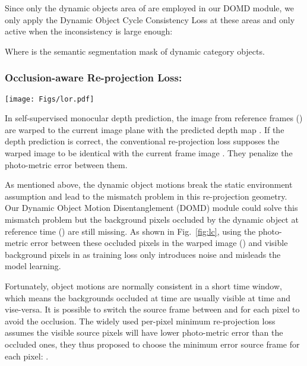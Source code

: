 \documentclass[runningheads]{llncs}
\begin{document}
Since only the dynamic objects area of  are employed in our DOMD module, we only apply the Dynamic Object Cycle Consistency Loss  at these areas and only active when the inconsistency is large enough:

Where  is the semantic segmentation mask of dynamic category objects. 

\subsubsection{Occlusion-aware Re-projection Loss: }

\begin{figure*}[t]
\centering
\texttt{[image: Figs/lor.pdf]}
\caption{ \textbf{Occlusion-aware Re-projection Loss: }Using the non-occluded source pixels for the re-projection loss could avoid most occlusions. The widely-used~\cite{monodepth2,manydepth,featdepth} per-pixel minimum  fails when the occluded pixels do not have lower photo-metric error. We propose Occlusion-aware Re-projection Loss  to solve this problem.}
\label{fig:lc}
\end{figure*}

In self-supervised monocular depth prediction, the image from reference frames () are warped to the current image plane with the predicted depth map . If the depth prediction is correct, the conventional re-projection loss  supposes the warped image  to be identical with the current frame image . They penalize the photo-metric error  between them.


As mentioned above, the dynamic object motions break the static environment assumption and lead to the mismatch problem in this re-projection geometry. Our Dynamic Object Motion Disentanglement (DOMD) module  could solve this mismatch problem but the background pixels occluded by the dynamic object at reference time () are still missing. As shown in Fig.~\ref{fig:lc}, using the photo-metric error  between these occluded pixels in the warped image () and visible background pixels in  as training loss only introduces noise and misleads the model learning. 

Fortunately, object motions are normally consistent in a short time window, which means the backgrounds occluded at time  are usually visible at time  and vise-versa. It is possible to switch the source frame between  and  for each pixel to avoid the occlusion. The widely used per-pixel minimum re-projection loss~\cite{monodepth2}  assumes the visible source pixels will have lower photo-metric error than the occluded ones, they thus proposed to choose the minimum error source frame for each pixel: .
\end{document}
